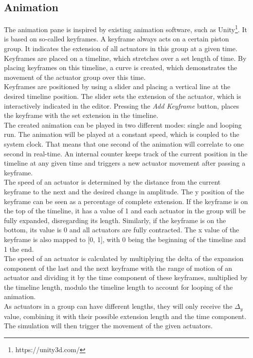 \subsection{Animation}
The animation pane is inspired by existing animation software, such as Unity\footnote{https://unity3d.com/}. It is based on so-called keyframes. A keyframe always acts on a certain piston group. It indicates the extension of all actuators in this group at a given time. Keyframes are placed on a timeline, which stretches over a set length of time. By placing keyframes on this timeline, a curve is created, which demonstrates the movement of the actuator group over this time.\\
Keyframes are positioned by using a slider and placing a vertical line at the desired timeline position. The slider sets the extension of the actuator, which is interactively indicated in the editor. Pressing the \textit{Add Keyframe} button, places the keyframe with the set extension in the timeline.\\
The created animation can be played in two different modes: single and looping run. The animation will be played at a constant speed, which is coupled to the system clock. That means that one second of the animation will correlate to one second in real-time. An internal counter keeps track of the current position in the timeline at any given time and triggers a new actuator movement after passing a keyframe.\\
The speed of an actuator is determined by the distance from the current keyframe to the next and the desired change in amplitude. The y position of the keyframe can be seen as a percentage of complete extension. If the keyframe is on the top of the timeline, it has a value of 1 and each actuator in the group will be fully expanded, disregarding its length. Similarly, if the keyframe is on the bottom, its value is 0 and all actuators are fully contracted. The x value of the keyframe is also mapped to [0, 1], with 0 being the beginning of the timeline and 1 the end.\\
The speed of an actuator is calculated by multiplying the delta of the expansion component of the last and the next keyframe with the range of motion of an actuator and dividing it by the time component of these keyframes, multiplied by the timeline length, modulo the timeline length to account for looping of the animation.\\
As actuators in a group can have different lengths, they will only receive the $\Delta_y$ value, combining it with their possible extension length and the time component. The simulation will then trigger the movement of the given actuators.
